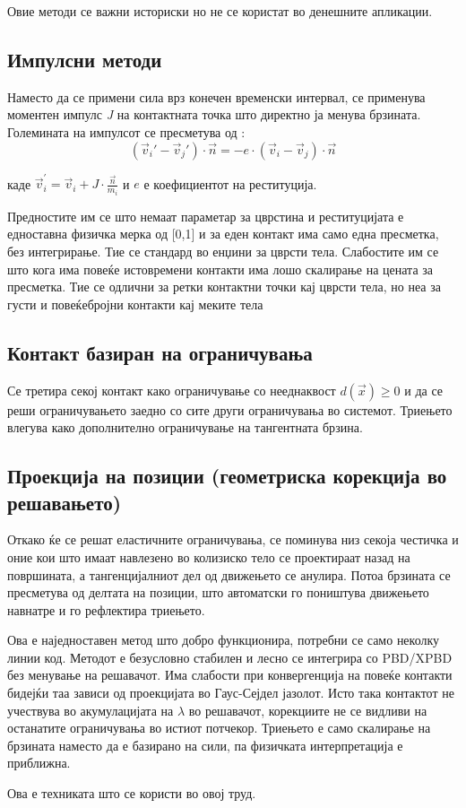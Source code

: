 Овие методи се важни историски но не се користат во денешните апликации.

\subsection{Импулсни методи}

Наместо да се примени сила врз конечен временски интервал, се применува моментен импулс \textit{J} на контактната точка што директно ја менува брзината. Големината на импулсот се пресметува од :
$$(\vec{v}_i' - \vec{v}_j') \cdot \vec{n} = -e \cdot (\vec{v}_i - \vec{v}_j) \cdot \vec{n}$$

\noindent каде $\vec{v}_{i}^{'} = \vec{v}_i + J \cdot \frac{\vec{n}}{m_i}$ и $e$ е коефициентот на реституција.

Предностите им се што немаат параметар за цврстина и реституцијата е едноставна физичка мерка од [0,1] и за еден контакт има само една пресметка, без интегрирање. Тие се стандард во енџини за цврсти тела. Слабостите им се што кога има повеќе истовремени контакти има лошо скалирање на цената за пресметка. Тие се одлични за ретки контактни точки кај цврсти тела, но неа за густи и повеќебројни контакти кај меките тела

\subsection{Контакт базиран на ограничувања}
Се третира секој контакт како ограничување со нееднаквост $d(\vec{x}) \geq 0$ и да се реши ограничувањето заедно со сите други ограничувања во системот. Триењето влегува како дополнително ограничување на тангентната брзина.



\subsection{Проекција на позиции (геометриска корекција во решавањето)}
Откако ќе се решат еластичните ограничувања, се поминува низ секоја честичка и оние кои што имаат навлезено во колизиско тело се проектираат назад на површината, а тангенцијалниот дел од движењето се анулира. Потоа брзината се пресметува од делтата на позиции, што автоматски го поништува движењето навнатре и го рефлектира триењето.

Ова е наједноставен метод што добро функционира, потребни се само неколку линии код. Методот е безусловно стабилен и лесно се интегрира со PBD/XPBD без менување на решавачот.  
Има слабости при конвергенција на повеќе контакти бидејќи таа зависи од проекцијата во Гаус-Сејдел јазолот. Исто така контактот не учествува во акумулацијата на $\lambda$ во решавачот, корекциите не се видливи на останатите ограничувања во истиот потчекор. Триењето е само скалирање на брзината наместо да е базирано на сили, па физичката интерпретација е приближна.

Ова е техниката што се користи во овој труд.

